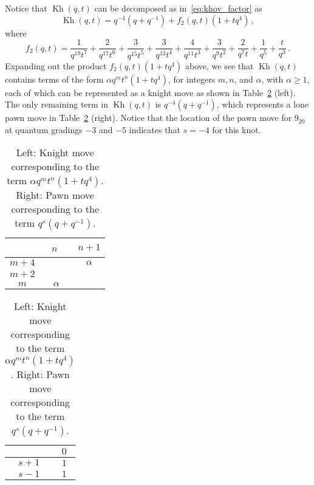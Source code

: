 \documentclass[11pt]{article}
\DeclareMathOperator{\Kh}{Kh}
\numberwithin{equation}{section}
\begin{document}
Notice that $\Kh (q,t)$ can be decomposed as in~\eqref{eq:khov_factor} as
\begin{equation}
\Kh (q,t)  = q^{-4}(q+q^{-1}) + f_2(q,t)(1+tq^4)\, ,
\end{equation}
where 
\begin{equation}
f_2(q,t) = \frac{1}{q^{19} t^7}+\frac{2}{q^{17} t^6}+\frac{3}{q^{15} t^5}+\frac{3}{q^{13}
   t^4}+\frac{4}{q^{11} t^3}+\frac{3}{q^9 t^2}+\frac{2}{q^7
   t}+\frac{1}{q^5}+\frac{t}{q^3}\, .
\end{equation}
Expanding out the product $f_2(q,t)(1+tq^4)$ above, we see that $\Kh (q,t)$ contains terms of the form $\alpha q^mt^n(1+tq^4)$, for integers $m, n$, and $\alpha$, with $\alpha\geq 1$, each of which can be represented as a knight move as shown in Table~\ref{tab:knightpawnmove} (left).  The only remaining term in $\Kh(q,t)$ is $q^{-4}(q+q^{-1})$, which represents a lone pawn move in Table~\ref{tab:knightpawnmove} (right).  Notice that the location of the pawn move for $9_{20}$ at quantum gradings $-3$ and $-5$  indicates that $s=-4$ for this knot. 
\begin{table}
\begin{center}
\begin{tabular}{|c||c|c|}
\hline 
  &\,\,   $n$  \, \, & $n+1$ \\
\hline\hline
$m+4$  &  & $\alpha$  \\
\hline 
 $m+2$ &  &  \\
\hline
 $m$ & $\alpha$ &  \\
\hline
\end{tabular}
\qquad\qquad
\begin{tabular}{|c||c|}
\hline
  &  $0$  \\
\hline \hline
 $s+1$  & $1$   \\
\hline 
 $s-1$  & $1$   \\
 \hline
\end{tabular}
\end{center}
\caption{\small{Left: Knight move corresponding to the term $\alpha q^mt^n(1+tq^4)$. Right: Pawn move corresponding to the term $q^s(q+q^{-1})$.}}
\label{tab:knightpawnmove}
\end{table}
\end{document}
